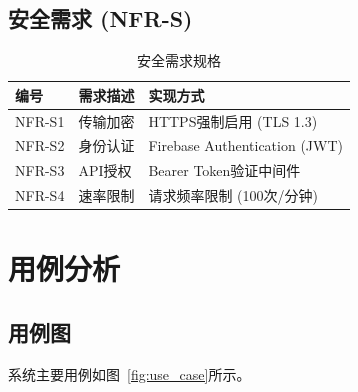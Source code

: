 \subsection{安全需求 (NFR-S)}

\begin{table}[H]
  \centering
  \caption{安全需求规格}
  \label{tab:nfr_security}
  \begin{tabular}{p{2cm}p{5cm}p{5cm}}
    \toprule
    \textbf{编号} & \textbf{需求描述} & \textbf{实现方式}                 \\
    \midrule
    NFR-S1      & 传输加密          & HTTPS强制启用 (TLS 1.3)           \\
    NFR-S2      & 身份认证          & Firebase Authentication (JWT) \\
    NFR-S3      & API授权         & Bearer Token验证中间件             \\
    NFR-S4      & 速率限制          & 请求频率限制 (100次/分钟)              \\
    \bottomrule
  \end{tabular}
\end{table}

\section{用例分析}

\subsection{用例图}

系统主要用例如图~\ref{fig:use_case}所示。

